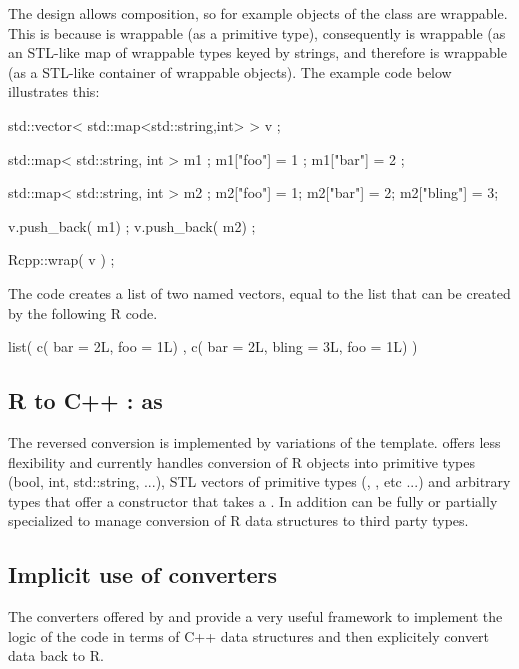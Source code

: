 The design allows composition, so for example objects of the class
 are wrappable. This is 
because  is wrappable (as a primitive type), consequently 
 is wrappable (as an STL-like map of 
wrappable types keyed by strings, and therefore
 is wrappable (as a 
STL-like container of wrappable objects). The example code below
illustrates this: 

\begin{example}
std::vector< std::map<std::string,int> > v ;

std::map< std::string, int > m1 ;
m1["foo"] = 1 ; m1["bar"] = 2 ;

std::map< std::string, int > m2 ;
m2["foo"] = 1; m2["bar"] = 2; m2["bling"] = 3;

v.push_back( m1) ;
v.push_back( m2) ;

Rcpp::wrap( v ) ;
\end{example}

The code creates a list of two named vectors, equal to the list that 
can be created by the following R code. 

\begin{example}
list( 
  c( bar = 2L, foo = 1L) , 
  c( bar = 2L, bling = 3L, foo = 1L) )
\end{example}

\subsection{R to C++ : as}

The reversed conversion is implemented by variations of the 
 template.  offers less flexibility and currently
handles conversion of R objects into primitive types (bool, int, std::string, ...), 
STL vectors of primitive types  (, 
, etc ...) and arbitrary types that offer 
a constructor that takes a . In addition  can 
be fully or partially specialized to manage conversion of R data 
structures to third party types.

\subsection{Implicit use of converters}

The converters offered by  and  provide a very 
useful framework to implement the logic of the code in terms of C++ 
data structures and then explicitely convert data back to R. 

